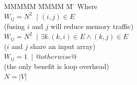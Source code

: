 \begin{tabbing}
MMMMM   \= MMMM \= M \= \kill
Where      \>                                       \\
           \> $W_{ij} = N^2$ \> $~|$ \> $(i,j) \in E $         \\
           \> \> \> (fusing $i$ and $j$ will reduce memory traffic)         \\
           \> $W_{ij} = N^2$ \> $~|$ \> $\exists k. (k,i) \in E \wedge (k,j) \in E $     \\
           \> \> \> ($i$ and $j$ share an input array)                                         \\
           \> $W_{ij} = 1$   \> $~|$ \> $@otherwise@$                                                  \\
           \> \> \> (the only benefit is loop overhead)                                        
\\[1ex]
           \> $N = |V|$
\end{tabbing}

% 
